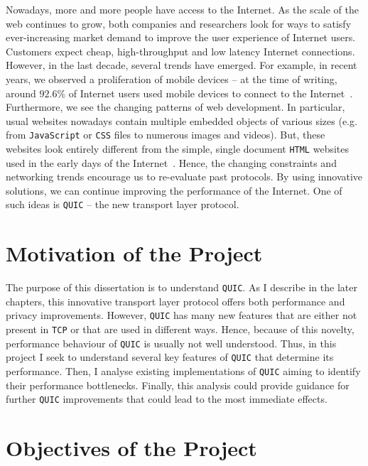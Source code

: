 \documentclass[12pt,a4paper,twoside,openright]{report}
\begin{document}
Nowadays, more and more people have access to the Internet.
As the scale of the web continues to grow, both companies and researchers look for ways to satisfy ever-increasing market demand to improve the user experience of Internet users.
Customers expect cheap, high-throughput and low latency Internet connections.
However, in the last decade, several trends have emerged.
For example, in recent years, we observed a proliferation of mobile devices -- at the time of writing, around $92.6\%$ of Internet users used mobile devices to connect to the Internet~\cite{bib_number_of_mobile_users}.
Furthermore, we see the changing patterns of web development.
In particular, usual websites nowadays contain multiple embedded objects of various sizes (e.g. from \texttt{JavaScript} or \texttt{CSS} files to numerous images and videos)\cite{bib_Netdev_0x13_QUIC_Tutorial}.
But, these websites look entirely different from the simple, single document \texttt{HTML} websites used in the early days of the Internet~\cite{RudmanRiaan2016DW3o}.
Hence, the changing constraints and networking trends encourage us to re-evaluate past protocols.
By using innovative solutions, we can continue improving the performance of the Internet. 
One of such ideas is \texttt{QUIC} -- the new transport layer protocol.

\section{Motivation of the Project}

The purpose of this dissertation is to understand \texttt{QUIC}.
As I describe in the later chapters, this innovative transport layer protocol offers both performance and privacy improvements.
However, \texttt{QUIC} has many new features that are either not present in \texttt{TCP} or that are used in different ways.
Hence, because of this novelty, performance behaviour of \texttt{QUIC} is usually not well understood.
Thus, in this project I seek to understand several key features of \texttt{QUIC} that determine its performance.
Then, I analyse existing implementations of \texttt{QUIC} aiming to identify their performance bottlenecks.
Finally, this analysis could provide guidance for further \texttt{QUIC} improvements that could lead to the most immediate effects.


\section{Objectives of the Project}
\end{document}
